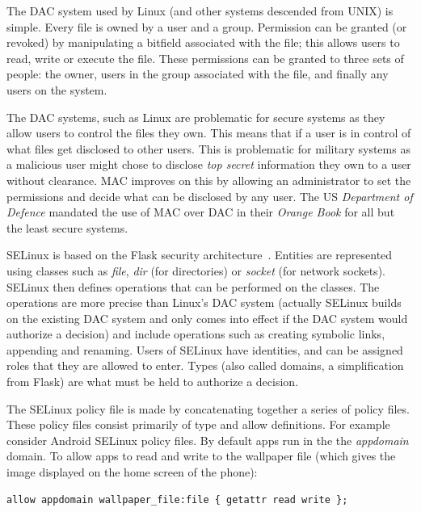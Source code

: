 \documentclass[a4paper]{article}
\begin{document}
The \ac{DAC} system used by Linux (and other systems descended from UNIX) is
simple.  Every file is owned by a user and a group.  Permission can be granted
(or revoked) by manipulating a bitfield associated with the file; this allows
users to read, write or execute the file.  These permissions can be granted to
three sets of people: the owner, users in the group associated with the file,
and finally any users on the system.

The \ac{DAC} systems, such as Linux are problematic for secure systems as they
allow users to control the files they own.  This means that if a user is in
control of what files get disclosed to other users.  This is problematic for
military systems as a malicious user might chose to disclose \emph{top secret}
information they own to a user without clearance.  \ac{MAC} improves on this by
allowing an administrator to set the permissions and decide what can be
disclosed by any user.  The US \emph{Department of Defence} mandated the use of
\ac{MAC} over \ac{DAC} in their \emph{Orange Book}\cite{LiliQiu:1985wq} for all but
the least secure systems.

SELinux is based on the Flask security architecture~\cite{Spencer:1999vm}.
Entities are represented using classes such as \emph{file}, \emph{dir} (for
directories) or \emph{socket} (for network sockets).  SELinux then defines
operations that can be performed on the classes.  The operations are more
precise than Linux's \ac{DAC} system (actually SELinux builds on the existing
\ac{DAC} system and only comes into effect if the \ac{DAC} system would
authorize a decision) and include operations such as creating symbolic links,
appending and renaming.  Users of SELinux have identities, and can be assigned
roles that they are allowed to enter.  Types (also called domains, a
simplification from Flask) are what must be held to authorize a decision.  

The SELinux policy file is made by concatenating together a series of policy
files.  These policy files consist primarily of type and allow definitions.
For example consider Android SELinux policy files.  By default apps run in the
the \emph{appdomain} domain.  To allow apps to read and write to the wallpaper
file (which gives the image displayed on the home screen of the phone):

\begin{lstlisting}[language=selinux]
allow appdomain wallpaper_file:file { getattr read write };
\end{lstlisting}
\end{document}
